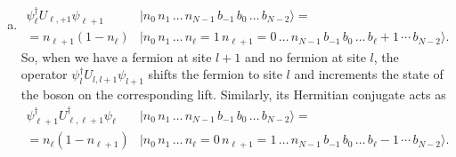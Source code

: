 \begin{enumerate}[(a)]
	\item %
	\begin{equation}\label{eq:ham_fir_t}\begin{split}
	\psi_\ell^\dagger U_{\ell,+1} \psi_{\ell+1} &|n_0\, n_1\, \ldots \, n_{N-1} \, b_{-1}\, b_0\, \ldots\, b_{N-2}\rangle=\\ = n_{\ell+1} (1-n_\ell) &|n_0\, n_1\, \ldots \, n_{\ell}=1 \, n_{\ell+1} = 0\,\ldots \, n_{N-1} \, b_{-1}\, b_0\, \ldots\,b_\ell + 1\,\cdots \, b_{N-2}\rangle.
	\end{split}
	\end{equation}
	So, when we have a fermion at site $l+1$ and no fermion at site $l$, the operator $\psi_l^\dagger U_{l,l+1} \psi_{l+1}$ shifts the fermion to site $l$ and increments the state of the boson on the corresponding lift. Similarly, its Hermitian conjugate acts as
		\[\begin{split}
	\psi_{\ell+1}^\dagger U_{\ell,\ell+1}^\dagger \psi_{\ell} &|n_0\, n_1\, \ldots \, n_{N-1} \, b_{-1}\, b_0\, \ldots\, b_{N-2}\rangle=\\ = n_{\ell} (1-n_{\ell+1}) &|n_0\, n_1\, \ldots \, n_{\ell} = 0\, n_{\ell+1} = 1\, \ldots\, n_{N-1} \, b_{-1}\, b_0\, \ldots\,b_\ell -1 \,\cdots \, b_{N-2}\rangle.
	\end{split}
	\]
	\end{enumerate}
